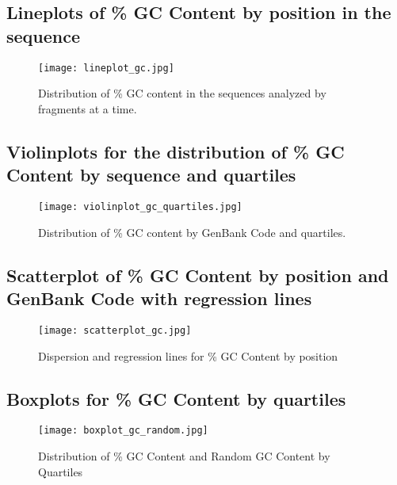 \documentclass{article}%
\begin{document}
%
\subsection{Lineplots of \% GC Content by position in the sequence}%
\label{subsec:LineplotsofGCContentbypositioninthesequence}%


\begin{figure}[!htbp]%
\centering%
\texttt{[image: lineplot\_gc.jpg]}%
\caption{Distribution of \% GC content in the sequences analyzed by fragments at a time.}%
\end{figure}

%
\subsection{Violinplots for the distribution of \% GC Content by sequence and quartiles}%
\label{subsec:ViolinplotsforthedistributionofGCContentbysequenceandquartiles}%


\begin{figure}[!htbp]%
\centering%
\texttt{[image: violinplot\_gc\_quartiles.jpg]}%
\caption{Distribution of \% GC content by GenBank Code and quartiles.}%
\end{figure}

%
\subsection{Scatterplot of \% GC Content by position and GenBank Code with regression lines}%
\label{subsec:ScatterplotofGCContentbypositionandGenBankCodewithregressionlines}%


\begin{figure}[!htbp]%
\centering%
\texttt{[image: scatterplot\_gc.jpg]}%
\caption{Dispersion and regression lines for \% GC Content by position}%
\end{figure}

%
\subsection{Boxplots for \% GC Content by quartiles}%
\label{subsec:BoxplotsforGCContentbyquartiles}%


\begin{figure}[h!]%
\centering%
\texttt{[image: boxplot\_gc\_random.jpg]}%
\caption{Distribution of \% GC Content and Random GC Content by Quartiles}%
\end{figure}
\end{document}
